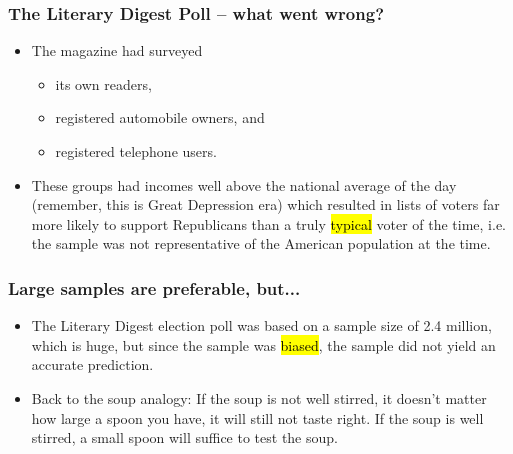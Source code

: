 \documentclass[slidestop,compress,mathserif]{beamer}
\begin{document}

\begin{frame}
	\frametitle{The Literary Digest Poll -- what went wrong?}

	\begin{itemize}
		\item The magazine had surveyed
		\begin{itemize}
			\item its own readers,
			\item registered automobile owners, and
			\item registered telephone users.
		\end{itemize}
		\item These groups had incomes well above the national average of the day (remember, this is Great Depression era) which resulted in lists of voters far more likely to support Republicans than a truly \hl{typical} voter of the time, i.e. the sample was not representative of the American population at the time.
	\end{itemize}

\end{frame}


\begin{frame}

	\frametitle{Large samples are preferable, but...}

	\begin{itemize}
		\item The Literary Digest election poll was based on a sample size of 2.4 million, which is huge, but since the sample was \hl{biased}, the sample did not yield an accurate prediction.
		\item Back to the soup analogy: If the soup is not well stirred, it doesn't matter how large a spoon you have, it will still not taste right. If the soup is well stirred, a small spoon will suffice to test the soup.
	\end{itemize}

\end{frame}



\end{document}
